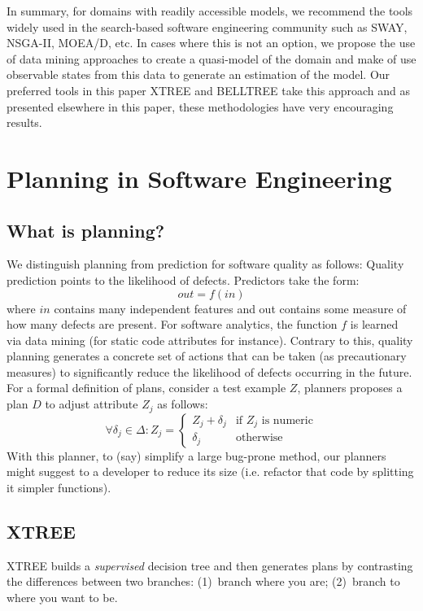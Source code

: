 \documentclass[conference]{IEEEtran}
\theoremstyle{break}
\begin{document}
In summary, for domains with readily accessible models, we recommend
the tools widely used in the search-based
software engineering community such as SWAY, NSGA-II, MOEA/D, etc. In cases where this is not an option, we propose the use of data mining approaches to create a quasi-model of the domain 
and make of use observable states from this data to generate an estimation of the model. Our preferred tools in this paper XTREE and BELLTREE take this approach and as presented elsewhere in this paper, these methodologies have very encouraging results.

\section{Planning in Software Engineering}

\subsection{What is planning?}
We distinguish planning from prediction for software quality as follows: 
Quality prediction points to the likelihood of defects. Predictors take the form:
$$
    out = f(in)    
$$
where $in$ contains many independent features and out contains some measure of
how many defects are present. For software analytics, the function $f$ is learned via data mining (for static code attributes for instance). Contrary to this, quality planning generates a concrete set of actions that can be taken (as precautionary measures) to significantly reduce the likelihood of defects occurring in the future. For a formal definition of plans, consider a test example $Z$, planners
proposes a plan $D$ to adjust attribute $Z_j$ as follows:
{\small\[
\forall \delta_j \in \Delta :  Z_j =  
\begin{cases}
     Z_j + \delta_j& \text{if $Z_j$ is numeric}\\
    \delta_j              & \text{otherwise}
\end{cases}
\]}
With this planner, to (say) simplify a large bug-prone method, our planners
might suggest to a developer to reduce its size (i.e. refactor that
code by splitting it simpler functions).


\subsection{XTREE}
\label{sect:xtree}
XTREE builds a {\em supervised} decision tree and then generates
plans by contrasting the differences between two branches:
(1)~branch where you are; (2)~branch to where you want to be.
\end{document}
